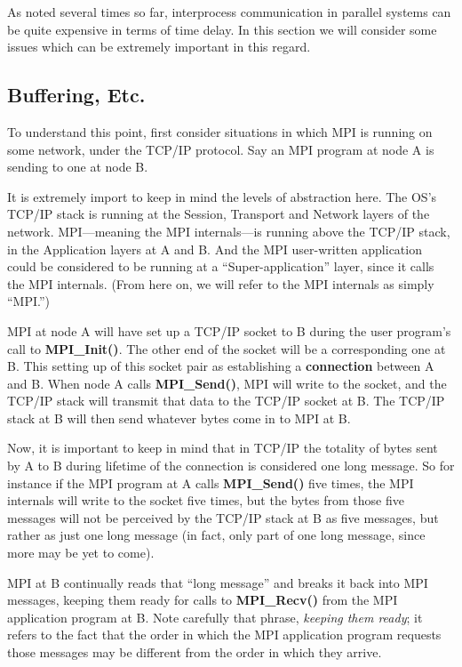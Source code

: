 As noted several times so far, interprocess communication in parallel
systems can be quite expensive in terms of time delay.  In this section
we will consider some issues which can be extremely important in this
regard.

\subsection{Buffering, Etc.}

To understand this point, first consider situations in which MPI is
running on some network, under the TCP/IP protocol.  Say an MPI program
at node A is sending to one at node B.

It is extremely import to keep in mind the levels of abstraction here.
The OS's TCP/IP stack is running at the Session, Transport and Network
layers of the network.  MPI---meaning the MPI internals---is running
above the TCP/IP stack, in the Application layers at A and B.  And the
MPI user-written application could be considered to be running at a
``Super-application'' layer, since it calls the MPI internals.  (From
here on, we will refer to the MPI internals as simply ``MPI.'')

MPI at node A will have set up a TCP/IP socket to B during the user
program's call to {\bf MPI\_Init()}.  The other end of the socket will
be a corresponding one at B.  This setting up of this socket pair as
establishing a {\bf connection} between A and B.  When node A calls {\bf
MPI\_Send()}, MPI will write to the socket, and the TCP/IP stack will
transmit that data to the TCP/IP socket at B.  The TCP/IP stack at B
will then send whatever bytes come in to MPI at B.

Now, it is important to keep in mind that in TCP/IP the totality of
bytes sent by A to B during lifetime of the connection is considered one
long message.  So for instance if the MPI program at A calls {\bf
MPI\_Send()} five times, the MPI internals will write to the socket five
times, but the bytes from those five messages will not be perceived by
the TCP/IP stack at B as five messages, but rather as just one long
message (in fact, only part of one long message, since more may be yet
to come).

MPI at B continually reads that ``long message'' and breaks it back into
MPI messages, keeping them ready for calls to {\bf MPI\_Recv()} from the
MPI application program at B.  Note carefully that phrase, {\it keeping
them ready}; it refers to the fact that the order in which the MPI
application program requests those messages may be different from the
order in which they arrive.

